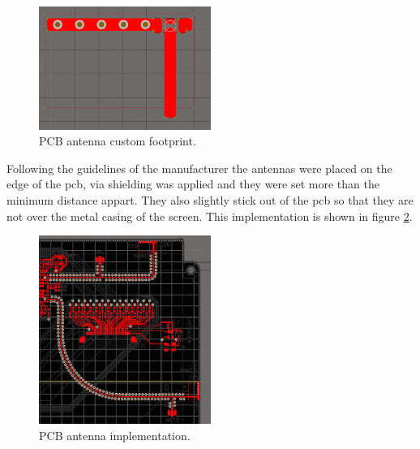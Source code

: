 \begin{figure}[!htb]
    \centering
    \includegraphics[width=0.5\textwidth,keepaspectratio]{chap/hardFig/antenna_footprint}
    \caption{PCB antenna custom footprint.}
    \label{fig:wl1835 pcb antennas}
\end{figure}

Following the guidelines of the manufacturer the antennas were placed on the edge of the pcb, via shielding was applied and they were set more than the minimum distance appart. They also slightly stick out of the pcb so that they are not over the metal casing of the screen. This implementation is shown in figure \ref{fig:pcb antennas implement}.

\begin{figure}[!htb]
    \centering
    \includegraphics[width=0.5\textwidth,keepaspectratio]{chap/hardFig/antenna_implementation}
    \caption{PCB antenna implementation.}
    \label{fig:pcb antennas implement}
\end{figure}

\clearpage
